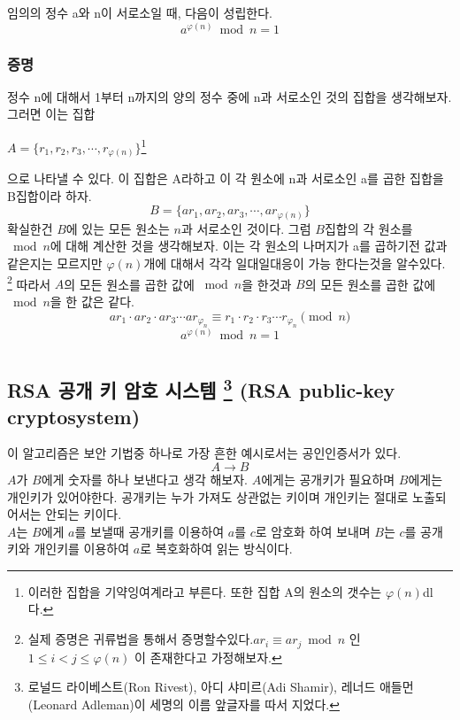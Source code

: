 \documentclass{oblivoir}
\begin{document}
\begin{justbox}
임의의 정수 a와 n이 서로소일 때, 다음이 성립한다.
\[a^{\varphi(n)} \bmod n = 1\]
\end{justbox}

\subsection{증명}
정수 n에 대해서 1부터 n까지의 양의 정수 중에 n과 서로소인 것의 집합을 생각해보자.
그러면 이는 집합
\begin{center}
    $A = \{ r_1 ,r_2,r_3, \cdots ,r_{\varphi(n)}\}$\footnote{이러한 집합을 기약잉여계라고 부른다. 또한 집합 A의 원소의 갯수는 $\varphi(n)$dl다.}
\end{center}
으로 나타낼 수 있다. 이 집합은 A라하고 이 각 원소에 n과 서로소인 a를 곱한 집합을 B집합이라 하자.
\[B = \{ ar_1 ,ar_2,ar_3, \cdots ,ar_{\varphi(n)}\} \]
확실한건 $B$에 있는 모든 원소는 $n$과 서로소인 것이다. 
그럼 $B$집합의 각 원소를 $\bmod n$에 대해 계산한 것을 생각해보자.
 이는 각 원소의 나머지가 a를 곱하기전 값과 같은지는 모르지만 $\varphi(n)$개에 대해서 각각 일대일대응이 가능 한다는것을 알수있다.
  \footnote{실제 증명은 귀류법을 통해서 증명할수있다.$ar_i  \equiv ar_j \bmod n $ 인 $1 \le i < j \le \varphi(n)$ 이 존재한다고 가정해보자.}
따라서 $A$의 모든 원소를 곱한 값에 $\bmod n$을 한것과 $B$의 모든 원소를 곱한 값에 $\bmod n$을 한 값은 같다.
\[ar_1 \cdot ar_2 \cdot ar_3 \cdots ar_{\varphi_{n}} \equiv r_1 \cdot r_2 \cdot r_3 \cdots r_{\varphi_{n}} \pmod n\]
\[a^{\varphi(n)}\bmod n= 1\]

\newpage

\chapter{}
\section{RSA 공개 키 암호 시스템 
\protect\footnote{로널드 라이베스트(Ron Rivest), 아디 샤미르(Adi Shamir), 레너드 애들먼(Leonard Adleman)이 세명의 이름 앞글자를 따서 지었다.}
(RSA public-key cryptosystem)}

이 알고리즘은 보안 기법중 하나로 가장 흔한 예시로서는 공인인증서가 있다.
    \[A \longrightarrow B\]
$A$가 $B$에게 숫자를 하나 보낸다고 생각 해보자. $A$에게는 공개키가 필요하며 $B$에게는 개인키가 있어야한다. 공개키는 누가 가져도 상관없는 키이며 개인키는 절대로 노출되어서는 안되는 키이다.\\
$A$는 $B$에게 $a$를 보낼때 공개키를 이용하여 $a$를 $c$로 암호화 하여 보내며 $B$는 $c$를 공개키와 개인키를 이용하여 $a$로 복호화하여 읽는 방식이다.
\end{document}

